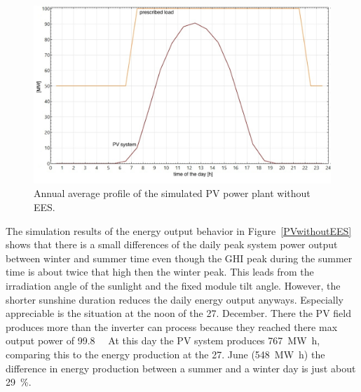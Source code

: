 \begin{figure}[htbp]  
\centering
\includegraphics[width=0.8\linewidth]{FIG/PVwithoutEESanual}
\caption[Annual average profile of the simulated PV power plant without EES.]{Annual average profile of the simulated PV power plant without EES.}\label{PVwithoutEESanual}
\end{figure}
The simulation results of the energy output behavior in Figure~\ref{PVwithoutEES} shows that there is a small differences of the daily peak system power output between winter and summer time even though the GHI peak during the summer time is about twice that high then the winter peak. This leads from the irradiation angle of the sunlight and the fixed module tilt angle. However, the shorter sunshine duration reduces the daily energy output anyways. Especially appreciable is the situation at the noon of the 27. December. There the PV field produces more than the inverter can process because they reached there max output power of \SI{99.8}{\mega\wattsac} At this day the PV system produces \SI{767}{\mega\watt\hour}, comparing this to the energy production at the 27. June (\SI{548}{\mega\watt\hour}) the difference in energy production between a summer and a winter day is just about \SI{29}{\percent}.

